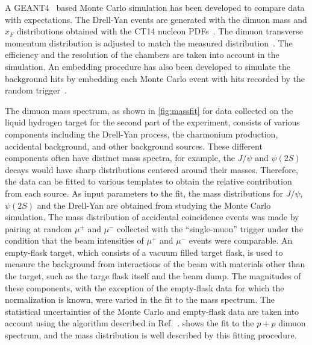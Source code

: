 \documentclass[reprint,aps,unsortedaddress,superscriptaddress,prl,floatfix,showpacs,linenumbers]{revtex4-2}
\begin{document}
A GEANT4~\cite{agostinelli2003,allison2006,allison2016} based Monte
Carlo simulation has been developed to compare data with expectations.
The Drell-Yan events are generated with the dimuon mass and $x_F$
distributions obtained with the CT14 nucleon PDFs~\cite{hou2018}.
The dimuon transverse momentum distribution is adjusted to match the measured distribution~\cite{prasad2020,leung2024}.
The efficiency and the resolution of the chambers are taken into account in the simulation.
An embedding procedure has also been developed to simulate the background hits by embedding each Monte Carlo event
with hits recorded by the random trigger~\cite{dove2020}.

The dimuon mass spectrum, as shown in \cref{fig:massfit} for data collected
on the liquid hydrogen target for the second part of the experiment, consists
of various components including the Drell-Yan process, the charmonium
production, accidental background, and other background sources.
These different components often have distinct mass spectra, for example, the $J/\psi$
and $\psi\left(2S\right)$ decays would have sharp distributions centered around their masses.
Therefore, the data can be fitted to various templates to obtain
the relative contribution from each source.
As input parameters to the fit, the mass distributions for $J/\psi$, $\psi\left(2S\right)$
and the Drell-Yan are obtained from studying the Monte Carlo simulation. %
The mass distribution of accidental coincidence events was made by pairing at random $\mu^+$ and $\mu^-$ collected with the ``single-muon'' trigger
under the condition that the beam intensities of $\mu^+$ and $\mu^-$ events were comparable.
An empty-flask target, which consists of a vacuum filled target flask, is used to measure the background from interactions of the beam with materials other than the target,
such as the targe flask itself and the beam dump.
The magnitudes of these components,
with the exception of the empty-flask data for which the normalization is known,
were varied in the fit to the mass spectrum.
The statistical uncertainties of the Monte Carlo and empty-flask data are taken into account using the algorithm described in Ref.~\cite{barlow1993}.
 shows the fit to the $p+p$ dimuon spectrum,
and the mass distribution is well described by this fitting procedure.
\end{document}
